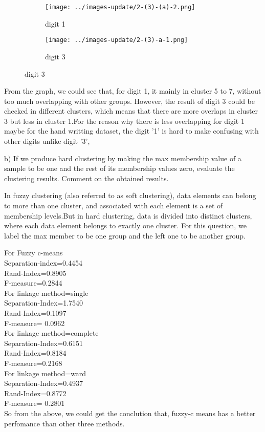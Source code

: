 \documentclass[]{article}
\begin{document}
\begin{figure}[p]
	\centering
	\begin{subfigure}{.5\textwidth}
		\centering
		\texttt{[image: ../images-update/2-(3)-(a)-2.png]}
		\caption{digit 1}
		\label{fig:sub1}
	\end{subfigure}
	
	\begin{subfigure}{.5\textwidth}
		\centering
		\texttt{[image: ../images-update/2-(3)-a-1.png]}
		\caption{digit 3}
		\label{fig:sub1}
	\end{subfigure}
	
\end{figure}

From the graph, we could see that, for digit 1, it mainly in cluster 5 to 7, without too much overlapping with other groups. However, the result of digit 3 could be checked in different clusters, which means that there are more overlaps in cluster 3 but less in cluster 1.For the reason why there is less overlapping for digit 1 maybe for the hand writting dataset, the digit '1' is hard to make confusing with other digits unlike digit '3', 
 
b) If we produce hard clustering by making the max membership value of a sample to be one and the rest of its membership values zero, evaluate the clustering results. Comment on the obtained results.

In fuzzy clustering (also referred to as soft clustering), data elements can belong to more than one cluster, and associated with each element is a set of membership levels.But in hard clustering, data is divided into distinct clusters, where each data element belongs to exactly one cluster. For this question, we label the max member to be one group and the left one to be another group. 

For Fuzzy c-means\\
Separation-index=0.4454\\
Rand-Index=0.8905\\
F-measure=0.2844\\

For linkage method=single\\
Separation-Index=1.7540 \\
Rand-Index=0.1097\\
F-measure= 0.0962\\
For linkage method=complete\\
Separation-Index=0.6151 \\
Rand-Index=0.8184 \\
F-measure=0.2168\\
For linkage method=ward\\
Separation-Index=0.4937 \\
Rand-Index=0.8772 \\
F-measure= 0.2801 \\

So from the above, we could get the conclution that, fuzzy-c means has a better perfomance than other three methods.
\end{document}

